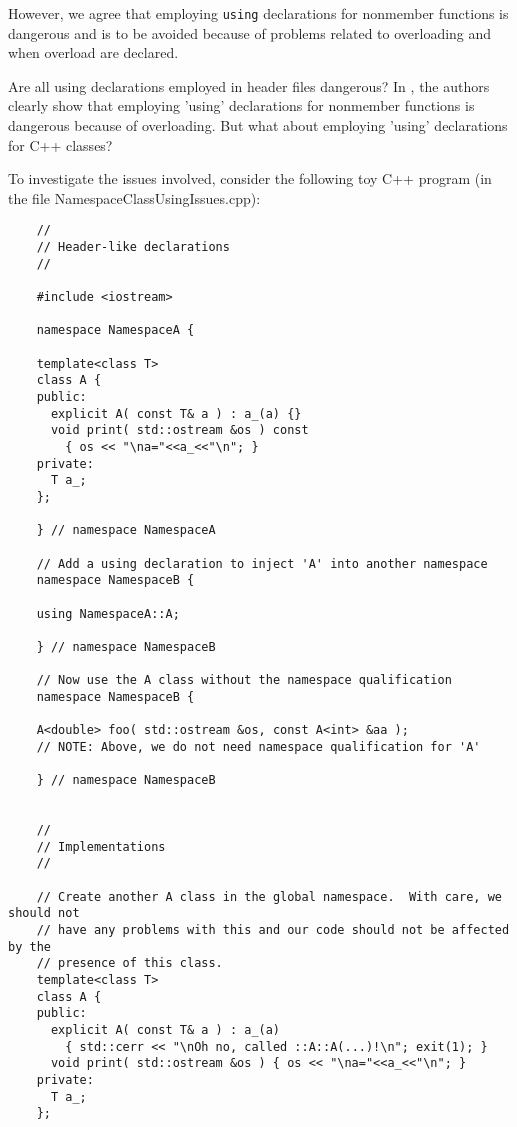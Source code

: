 {}\noindent{}However, we agree that employing {}\texttt{using} declarations
for nonmember functions is dangerous and is to be avoided because of problems
related to overloading and when overload are declared.

Are all using declarations employed in header files dangerous?  In
{}\cite[Item 59]{C++CodingStandards05}, the authors clearly show that
employing 'using' declarations for nonmember functions is dangerous because of
overloading.  But what about employing 'using' declarations for C++ classes?

To investigate the issues involved, consider the following toy C++ program (in
the file NamespaceClassUsingIssues.cpp):

{\small\begin{verbatim}
    //
    // Header-like declarations
    //
    
    #include <iostream>
    
    namespace NamespaceA {
    
    template<class T>
    class A {
    public:
      explicit A( const T& a ) : a_(a) {}
      void print( std::ostream &os ) const
        { os << "\na="<<a_<<"\n"; }
    private:
      T a_;
    };
    
    } // namespace NamespaceA
    
    // Add a using declaration to inject 'A' into another namespace
    namespace NamespaceB {
    
    using NamespaceA::A;
    
    } // namespace NamespaceB
    
    // Now use the A class without the namespace qualification
    namespace NamespaceB {
    
    A<double> foo( std::ostream &os, const A<int> &aa );
    // NOTE: Above, we do not need namespace qualification for 'A'
    
    } // namespace NamespaceB
    
    
    //
    // Implementations
    //
    
    // Create another A class in the global namespace.  With care, we should not
    // have any problems with this and our code should not be affected by the
    // presence of this class.
    template<class T>
    class A {
    public:
      explicit A( const T& a ) : a_(a) 
        { std::cerr << "\nOh no, called ::A::A(...)!\n"; exit(1); }
      void print( std::ostream &os ) { os << "\na="<<a_<<"\n"; }
    private:
      T a_;
    };
    

\end{verbatim}}
